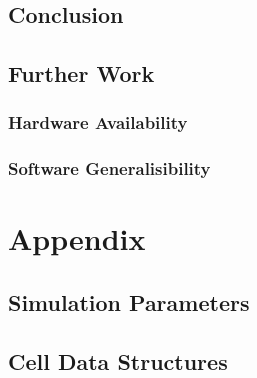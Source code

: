 \documentclass{UoYCSproject}
\begin{document}
\section{Conclusion}

\section{Further Work}
\subsection{Hardware Availability}

\subsection{Software Generalisibility}%


\printbibliography

\chapter{Appendix}
\section{Simulation Parameters}


\section{Cell Data Structures}
 
\end{document}

